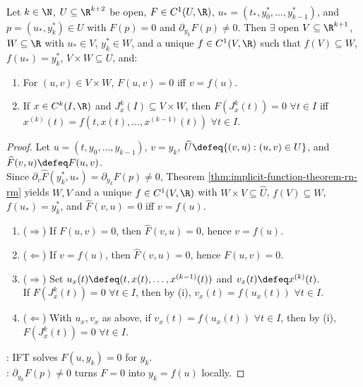 \begin{proposition} \label{prop:implicit-ode-local-explicit-form} \\
Let $k\in\N$, $U\subseteq\R^{k+2}$ be open, $F\in C^1(U,\R)$, $u_*=(t_*,y_0^*,\ldots,y_{k-1}^*)$, and $p=(u_*,y_k^*)\in U$ with $F(p)=0$ and $\partial_{y_k}F(p)\neq0$. Then $\exists$ open $V\subseteq\R^{k+1}$, $W\subseteq\R$ with $u_*\in V$, $y_k^*\in W$, and a unique $f\in C^1(V,\R)$ such that $f(V)\subseteq W$, $f(u_*)=y_k^*$, $V\times W\subseteq U$, and:
\begin{enumerate}[label=(\roman*)]
\setlength{\itemsep}{0pt}
\item For $(u,v)\in V\times W$, $F(u,v)=0$ iff $v=f(u)$.
\item If $x\in C^k(I,\R)$ and $J_x^k(I)\subseteq V\times W$, then $F(J_x^k(t))=0$ $\forall t\in I$ iff $x^{(k)}(t)=f(t,x(t),\ldots,x^{(k-1)}(t))$ $\forall t\in I$.
\end{enumerate}
\begin{proof}
Let $u=(t,y_0,\ldots,y_{k-1})$, $v=y_k$, $\widehat U\defeq\{(v,u):(u,v)\in U\}$, and $\widehat F(v,u)\defeq F(u,v)$.\\
Since $\partial_v\widehat F(y_k^*,u_*)=\partial_{y_k}F(p)\neq0$, Theorem \ref{thm:implicit-function-theorem-rn-rm} yields $W,V$ and a unique $f\in C^1(V,\R)$ with $W\times V\subseteq\widehat U$, $f(V)\subseteq W$, $f(u_*)=y_k^*$, and $\widehat F(v,u)=0$ iff $v=f(u)$.
\begin{enumerate}[label=(\roman*)]
\setlength{\itemsep}{0pt}
\item[$(i)$] ($\Rightarrow$) If $F(u,v)=0$, then $\widehat F(v,u)=0$, hence $v=f(u)$.
\item[$(i)$] ($\Leftarrow$) If $v=f(u)$, then $\widehat F(v,u)=0$, hence $F(u,v)=0$.
\item[$(ii)$] ($\Rightarrow$) Set $u_x(t)\defeq(t,x(t),\ldots,x^{(k-1)}(t))$ and $v_x(t)\defeq x^{(k)}(t)$.\\
If $F(J_x^k(t))=0$ $\forall t\in I$, then by (i), $v_x(t)=f(u_x(t))$ $\forall t\in I$.
\item[$(ii)$] ($\Leftarrow$) With $u_x,v_x$ as above, if $v_x(t)=f(u_x(t))$ $\forall t\in I$, then by (i), $F(J_x^k(t))=0$ $\forall t\in I$.
\end{enumerate}
: IFT solves $F(u,y_k)=0$ for $y_k$.\\
: $\partial_{y_k}F(p)\neq0$ turns $F=0$ into $y_k=f(u)$ locally.
\end{proof}
\end{proposition}

